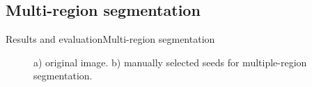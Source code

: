 \documentclass[10pt]{beamer}
\begin{document}
\subsection{Multi-region segmentation}
\begin{frame}{Results and evaluation}{Multi-region segmentation}

\begin{figure}[H]
  \centering
  \qquad
  \qquad
  \caption{a) original image. b) manually selected seeds for multiple-region segmentation.}
\end{figure}

\end{frame}
\end{document}
